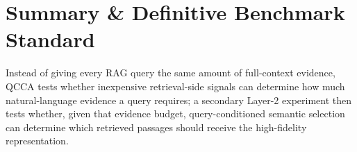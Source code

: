 \documentclass[11pt,a4paper]{article}
\begin{document}
\section{Summary \& Definitive Benchmark Standard}
\begin{summarybox}
Instead of giving every RAG query the same amount of full-context evidence, QCCA tests whether inexpensive retrieval-side signals can determine how much natural-language evidence a query requires; a secondary Layer-2 experiment then tests whether, given that evidence budget, query-conditioned semantic selection can determine which retrieved passages should receive the high-fidelity representation.
\end{summarybox}
\end{document}
